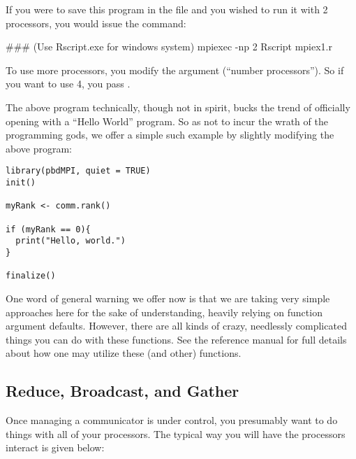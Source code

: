 If you were to save this program in the file  and you wished to run it with 2 processors, you would issue the command:

\begin{Command}
### (Use Rscript.exe for windows system)
mpiexec -np 2 Rscript mpiex1.r
\end{Command}

To use more processors, you modify the  argument (``number processors'').  So if you want to use 4, you pass .

The above program technically, though not in spirit, bucks the trend of officially opening with a ``Hello World'' program.  So as not to incur the wrath of the programming gods, we offer a simple such example by slightly modifying the above program:

\begin{lstlisting}[language=rr,title=Simple pbdMPI Example 1.5]
library(pbdMPI, quiet = TRUE)
init()

myRank <- comm.rank()

if (myRank == 0){
  print("Hello, world.")
}

finalize()
\end{lstlisting}

One word of general warning we offer now is that we are taking very simple approaches here for the sake of understanding, heavily relying on function argument defaults.  However, there are all kinds of crazy, needlessly complicated things you can do with these functions.  See the  reference manual for full details about how one may utilize these (and other)  functions.



\subsection{Reduce, Broadcast, and Gather}

Once managing a communicator is under control, you presumably want to do things with all of your processors.  The typical way you will have the processors interact is given below:

